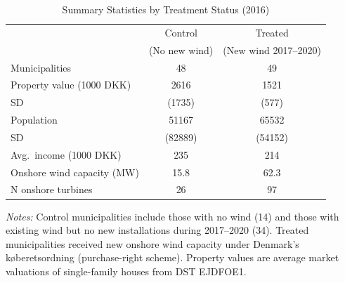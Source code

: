 \begin{table}[!ht]
\centering
\caption{Summary Statistics by Treatment Status (2016)}
\label{tab:summary}
\begin{tabular}{lcc}
\hline\hline
 & Control & Treated \\
 & (No new wind) & (New wind 2017--2020) \\
\hline
Municipalities & 48 & 49 \\
Property value (1000 DKK) & 2616 & 1521 \\
\quad SD & (1735) & (577) \\
Population & 51167 & 65532 \\
\quad SD & (82889) & (54152) \\
Avg.~income (1000 DKK) & 235 & 214 \\
Onshore wind capacity (MW) & 15.8 & 62.3 \\
N onshore turbines & 26 & 97 \\
\hline\hline
\end{tabular}
\begin{tablenotes}[flushleft]\small
\item \textit{Notes:} Control municipalities include those with no wind (14) and those
with existing wind but no new installations during 2017--2020 (34).
Treated municipalities received new onshore wind capacity under Denmark's
k{\o}beretsordning (purchase-right scheme). Property values are average market
valuations of single-family houses from DST EJDFOE1.
\end{tablenotes}
\end{table}
